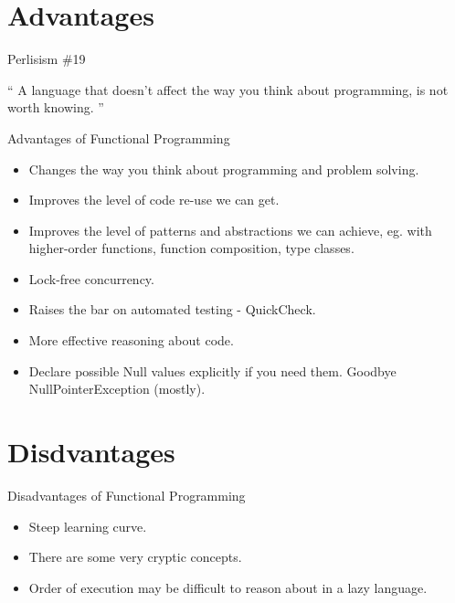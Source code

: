 \documentclass{beamer}
\begin{document}
\section{Advantages}

\begin{frame}{Perlisism \#19}

\begin{exampleblock}{}
  {\Large ``
    A language that doesn't affect the way you think about programming, is not worth knowing.
  ''}
  \vskip5mm
  \hspace*{}
\end{exampleblock}

\end{frame}

\begin{frame}{Advantages of Functional Programming}

  \begin{itemize}[<+->]
  \item Changes the way you think about programming and problem solving.
  \item Improves the level of code re-use we can get.
  \item Improves the level of patterns and abstractions we can achieve, eg.
    with higher-order functions, function composition, type classes.
  \item Lock-free concurrency.
  \item Raises the bar on automated testing - QuickCheck.
  \item More effective reasoning about code.
  \item Declare possible Null values explicitly if you need them.
    Goodbye NullPointerException (mostly).
  \end{itemize}

\end{frame}

\section{Disdvantages}

\begin{frame}{Disadvantages of Functional Programming}

  \begin{itemize}[<+->]
  \item Steep learning curve.
  \item There are some very cryptic concepts.
  \item Order of execution may be difficult to reason about in a lazy language.
  \end{itemize}

\end{frame}
\end{document}
